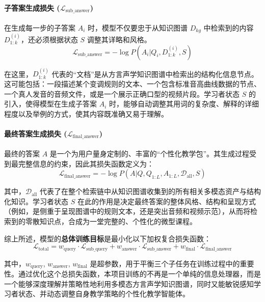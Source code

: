 \paragraph{子答案生成损失 ($\mathcal{L}_{\text{sub\_answer}}$)}
在生成每一步的子答案 $A_i$ 时，模型不仅要忠于从知识图谱 $D_{kg}$ 中检索到的内容 $D^{(i)}_{1:k}$，还必须根据状态 $S$ 调整其详略和风格。
\begin{equation}
\mathcal{L}_{\text{sub\_answer}} = - \log P(A_i | Q_i, D^{(i)}_{1:k}, S)
\end{equation}

在这里，$D^{(i)}_{1:k}$ 代表的“文档”是从方言声学知识图谱中检索出的结构化信息节点。这可能包括：一段描述某个变调规则的文本、一个包含标准音高曲线数据的节点、一个真人发音的音频文件，或是一个展示正确口型的视频片段。学习者状态 $S$ 的引入，使得模型在生成子答案 $A_i$ 时，能够自动调整其用词的复杂度、解释的详细程度以及举例的方式，使其内容既准确又易于理解。

\paragraph{最终答案生成损失 ($\mathcal{L}_{\text{final\_answer}}$)}
最终的答案 $A$ 是一个为用户量身定制的、丰富的“个性化教学包”。其生成过程受到最完整信息的约束，因此其损失函数定义为：
\begin{equation}
\mathcal{L}_{\text{final\_answer}} = - \log P(A | Q, Q_{1:L}, A_{1:L}, \mathcal{D}_{\text{all}}, S)
\end{equation}

其中，$\mathcal{D}_{\text{all}}$ 代表了在整个检索链中从知识图谱收集到的所有相关多模态资产与结构化知识。学习者状态 $S$ 在此的作用是决定最终答案的整体风格、结构和呈现方式（例如，是侧重于呈现图谱中的规则文本，还是突出音频和视频示范），从而将检索到的零散知识点，合成为一堂完整的、个性化的微型课程。

综上所述，模型的\textbf{总体训练目标}是最小化以下加权复合损失函数：
\begin{equation}
\mathcal{L}_{\text{total}} = w_{\text{query}} \cdot \mathcal{L}_{\text{sub\_query}} + w_{\text{answer}} \cdot \mathcal{L}_{\text{sub\_answer}} + w_{\text{final}} \cdot \mathcal{L}_{\text{final\_answer}}
\end{equation}

其中，$w_{\text{query}}$, $w_{\text{answer}}$, $w_{\text{final}}$ 是超参数，用于平衡三个子任务在训练过程中的重要性。通过优化这个总损失函数，本项目训练的不再是一个单纯的信息处理器，而是一个能够深度理解并策略性地利用多模态方言声学知识图谱，同时又能敏锐感知学习者状态、并动态调整自身教学策略的个性化教学智能体。

